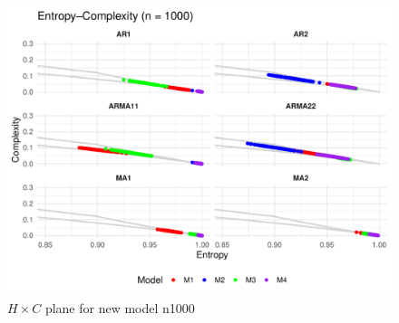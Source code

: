 \documentclass[11pt,a4paper]{article}
\begin{document}

\begin{figure}[H]
	\includegraphics[width=0.9 \textwidth]{New_model_group_plot_n1000}
	\caption{$H \times C$ plane for new model n1000}
	\label{fig:HC new n1000}
\end{figure}
\end{document}
